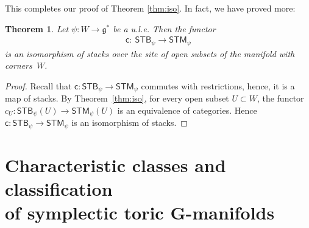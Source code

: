 \documentclass[pdftex]{sigma}
\numberwithin{equation}{section}
\newtheorem{Theorem}[Lemma]{Theorem}
\begin{document}
This completes our proof of Theorem \ref{thm:iso}.  In fact, we have
proved more:


\begin{Theorem} Let $\psi\colon W\to {\mathfrak g}^*$ be a u.l.e.
Then the functor
\begin{gather*}
{\textsf{c}} \colon \ {\textsf{STB}}_\psi \to {\textsf{STM}}_\psi
\end{gather*}
is an isomorphism of stacks over the site of open subsets of the
manifold with corners~$W$.
\end{Theorem}

\begin{proof}
Recall that
${\textsf{c}} \colon {\textsf{STB}}_\psi \to {\textsf{STM}}_\psi$ commutes with restrictions,
hence, it is a map of stacks.
By Theorem~\ref{thm:iso}, for every open subset $U \subset W$,
the functor $ c_U\colon  {\textsf{STB}}_\psi(U)\to {\textsf{STM}}_\psi (U) $
is an equivalence of categories.  Hence
${\textsf{c}} \colon {\textsf{STB}}_\psi \to {\textsf{STM}}_\psi$ is an isomorphism of stacks.
\end{proof}

\section[Characteristic classes and classif\/ication
of symplectic toric $G$-manifolds]{Characteristic classes and classif\/ication\\
of symplectic toric $\boldsymbol{G}$-manifolds}
\label{sec:invariants}
\end{document}

